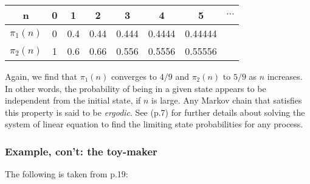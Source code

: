 \documentclass[../main.tex]{subfiles}
\begin{document}
\begin{small}
\begin{center} 
\begin{tabular}{ c|c|c|c|c|c|c|c  } 
 n & 0 & 1 & 2 & 3& 4 & 5 &$\cdots$ \\ 
  \hline
 $\pi_1(n)$ & 0& 0.4& 0.44& 0.444& 0.4444&0.44444 \\ 
 $\pi_2(n)$  & 1 & 0.6  & 0.66 &0.556 &0.5556&0.55556\\ 
\end{tabular}
\end{center}
Again, we find that $\pi_1(n)$ converges to $4/9$ and $\pi_2(n)$ to $5/9$ as $n$ increases. In other words, the probability of being in a given state appears to be independent from the initial state, if $n$ is large. Any Markov chain that satisfies this property is said to be \textit{ergodic}. See \cite{Howard1960} (p.7) for further details about solving the system of linear equation to find the limiting state probabilities for any process.

\end{small}


\subsubsection{Example, con't: the toy-maker \citep{Howard1960}}

The following is taken from \cite{Howard1960} p.19:
\end{document}
